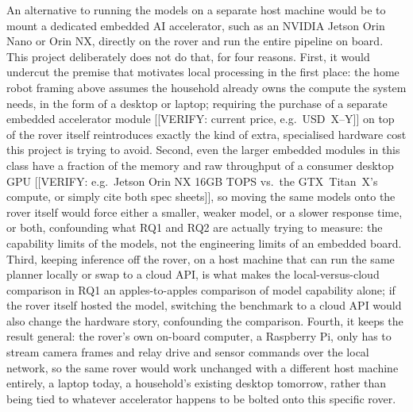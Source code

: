 An alternative to running the models on a separate host machine would be to mount a dedicated
embedded AI accelerator, such as an NVIDIA Jetson Orin Nano or Orin NX, directly on the rover and
run the entire pipeline on board. This project deliberately does not do that, for four reasons.
First, it would undercut the premise that motivates local processing in the first place: the home
robot framing above assumes the household already owns the compute the system needs, in the form
of a desktop or laptop; requiring the purchase of a separate embedded accelerator module
[[VERIFY: current price, e.g.\ USD~X--Y]] on top of the rover itself reintroduces exactly the kind
of extra, specialised hardware cost this project is trying to avoid. Second, even the larger
embedded modules in this class have a fraction of the memory and raw throughput of a consumer
desktop GPU [[VERIFY: e.g.\ Jetson Orin NX 16GB TOPS vs.\ the GTX~Titan~X's compute, or simply
cite both spec sheets]], so moving the same models onto the rover itself would force either a
smaller, weaker model, or a slower response time, or both, confounding what RQ1 and RQ2 are
actually trying to measure: the capability limits of the models, not the engineering limits of an
embedded board. Third, keeping inference off the rover, on a host machine that can run the same
planner locally or swap to a cloud API, is what makes the local-versus-cloud comparison in RQ1 an
apples-to-apples comparison of model capability alone; if the rover itself hosted the model,
switching the benchmark to a cloud API would also change the hardware story, confounding the
comparison. Fourth, it keeps the result general: the rover's own on-board computer, a Raspberry
Pi, only has to stream camera frames and relay drive and sensor commands over the local network,
so the same rover would work unchanged with a different host machine entirely, a laptop today, a
household's existing desktop tomorrow, rather than being tied to whatever accelerator happens to
be bolted onto this specific rover.



